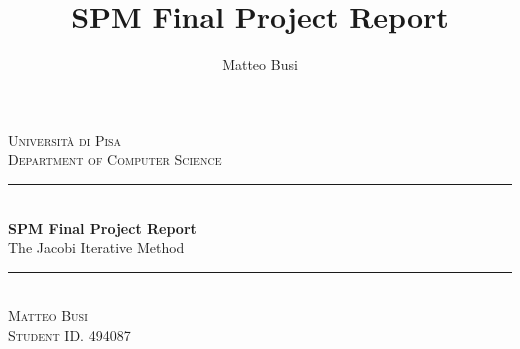 \documentclass[11pt,a4paper,oneside,titlepage]{article}
\author{Matteo Busi}
\title{SPM Final Project Report}
\newcommand{\HRule}{\rule{\linewidth}{0.5mm}} %
\begin{document}
	
	\begin{titlepage}
				
		\center %
		
		
		\textsc{\LARGE Universit\`a di Pisa}\\[1.5cm] %
		\textsc{\Large Department of Computer Science}\\[1.5cm] %
		
		
		\HRule \\[1cm]
		{ \huge \bfseries SPM Final Project Report}\\[0.4cm] %
		{ \Large The Jacobi Iterative Method }\\[0.4cm]
		\HRule \\[1.5cm]
		
		
		
		\Large %
		\textsc{Matteo Busi}\\[0.4cm]%
		\large
		\textsc{Student ID. 494087}\\[3cm]
		

\end{titlepage}
\end{document}
